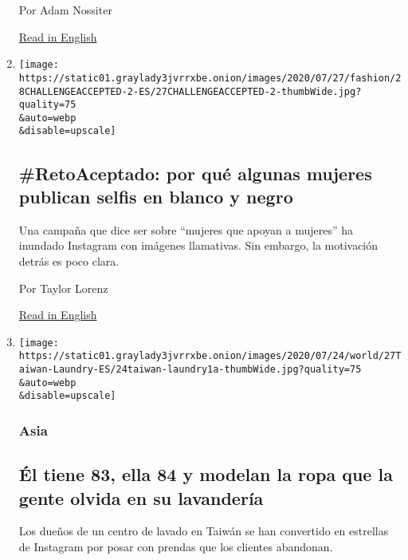\begin{enumerate}
  Por Adam Nossiter

  \href{https://www.nytimes3xbfgragh.onion/2020/07/27/world/europe/france-alsace-wine-coronavirus.html}{Read
  in English}
\item
  \href{/es/2020/07/28/espanol/estilos-de-vida/reto-selfi-blanco-negro.html}{}

  \texttt{[image: https://static01.graylady3jvrrxbe.onion/images/2020/07/27/fashion/28CHALLENGEACCEPTED-2-ES/27CHALLENGEACCEPTED-2-thumbWide.jpg?quality=75\\\&auto=webp\\\&disable=upscale]}

  \hypertarget{retoaceptado-por-quuxe9-algunas-mujeres-publican-selfis-en-blanco-y-negro}{%
  \subsection{\#RetoAceptado: por qué algunas mujeres publican selfis en
  blanco y
  negro}\label{retoaceptado-por-quuxe9-algunas-mujeres-publican-selfis-en-blanco-y-negro}}

  Una campaña que dice ser sobre ``mujeres que apoyan a mujeres'' ha
  inundado Instagram con imágenes llamativas. Sin embargo, la motivación
  detrás es poco clara.

  Por Taylor Lorenz

  \href{https://www.nytimes3xbfgragh.onion/2020/07/27/style/challenge-accepted-instagram.html}{Read
  in English}
\item
  \href{/es/2020/07/28/espanol/mundo/lavanderia-taiwanesa-instagram.html}{}

  \texttt{[image: https://static01.graylady3jvrrxbe.onion/images/2020/07/24/world/27Taiwan-Laundry-ES/24taiwan-laundry1a-thumbWide.jpg?quality=75\\\&auto=webp\\\&disable=upscale]}

  \hypertarget{asia}{%
  \subsubsection{Asia}\label{asia}}

  \hypertarget{uxe9l-tiene-83-ella-84-y-modelan-la-ropa-que-la-gente-olvida-en-su-lavanderuxeda}{%
  \subsection{Él tiene 83, ella 84 y modelan la ropa que la gente olvida
  en su
  lavandería}\label{uxe9l-tiene-83-ella-84-y-modelan-la-ropa-que-la-gente-olvida-en-su-lavanderuxeda}}

  Los dueños de un centro de lavado en Taiwán se han convertido en
  estrellas de Instagram por posar con prendas que los clientes
  abandonan.


\end{enumerate}
